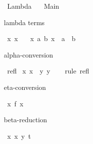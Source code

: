 %
\begin{isabellebody}%
%
%
\isadelimdocument
%
\endisadelimdocument
%
\isatagdocument
%
\isamarkuptrue%
%
\endisatagdocument
{\isafolddocument}%
%
\isadelimdocument
%
\endisadelimdocument
%
\isadelimtheory
%
\endisadelimtheory
%
\isatagtheory
{}\isamarkupfalse%
\ Lambda\isanewline
\ \ \ Main\ \isanewline
{}%
\endisatagtheory
{\isafoldtheory}%
%
\isadelimtheory
%
\endisadelimtheory
%
\begin{isamarkuptext}%
lambda terms%
\end{isamarkuptext}\isamarkuptrue%
\isamarkupfalse%
\ {\isachardoublequoteopen}{\isasymlambda}x{\isachardot}{\kern0pt}\ x\ {\isacharplus}{\kern0pt}\ {}{\isachardoublequoteclose}\isanewline
\isanewline
{}\isamarkupfalse%
\ {\isachardoublequoteopen}{\isasymlambda}x\ a\ b{\isachardot}{\kern0pt}\ x\ {\isacharplus}{\kern0pt}\ a\ {\isacharplus}{\kern0pt}\ b\ {\isacharplus}{\kern0pt}\ {}{\isachardoublequoteclose}%
\begin{isamarkuptext}%
alpha-conversion%
\end{isamarkuptext}\isamarkuptrue%
\isamarkupfalse%
\ refl\isanewline
\isanewline
{}\isamarkupfalse%
\ {\isachardoublequoteopen}{\isacharparenleft}{\kern0pt}{\isasymlambda}x{\isachardot}{\kern0pt}\ x{\isacharparenright}{\kern0pt}\ {\isacharequal}{\kern0pt}\ {\isacharparenleft}{\kern0pt}{\isasymlambda}y{\isachardot}{\kern0pt}\ y{\isacharparenright}{\kern0pt}{\isachardoublequoteclose}\isanewline
%
\isadelimproof
\ \ %
\endisadelimproof
%
\isatagproof
{}\isamarkupfalse%
\ {\isacharparenleft}{\kern0pt}rule\ refl{\isacharparenright}{\kern0pt}\isanewline
\ \ \isamarkupfalse%
%
\endisatagproof
{\isafoldproof}%
%
\isadelimproof
%
\endisadelimproof
%
\begin{isamarkuptext}%
eta-conversion%
\end{isamarkuptext}\isamarkuptrue%
\isamarkupfalse%
\ {\isachardoublequoteopen}{\isasymlambda}x{\isachardot}{\kern0pt}\ f\ x{\isachardoublequoteclose}%
\begin{isamarkuptext}%
beta-reduction%
\end{isamarkuptext}\isamarkuptrue%
\isamarkupfalse%
\ {\isachardoublequoteopen}{\isacharparenleft}{\kern0pt}{\isasymlambda}x{\isachardot}{\kern0pt}\ x\ y{\isacharparenright}{\kern0pt}\ t{\isachardoublequoteclose}%

\end{isabellebody}
